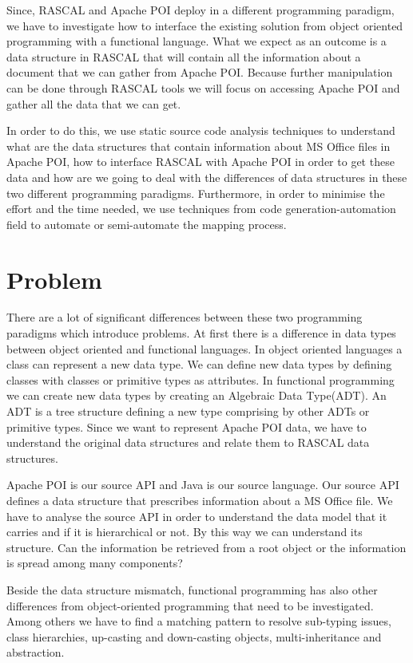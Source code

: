 Since, RASCAL and Apache POI deploy in a different programming paradigm, we have to investigate how to interface the existing solution from object oriented programming with a functional language. What we expect as an outcome is a data structure in RASCAL that will contain all the information about a document that we can gather from Apache POI. Because further manipulation can be done through RASCAL tools we will focus on accessing Apache POI and gather all the data that we can get. 

In order to do this, we use static source code analysis techniques to understand what are the data structures that contain information about MS Office files in Apache POI, how to interface RASCAL with Apache POI in order to get these data and how are we going to deal with the differences of data structures in these two different programming paradigms. Furthermore, in order to minimise the effort and the time needed, we use techniques from code generation-automation field to automate or semi-automate the mapping process.
\section{Problem}

There are a lot of significant differences between these two programming paradigms which introduce problems. At first there is a difference in data types between object oriented and functional languages. In object oriented languages a class can represent a new data type. We can define new data types by defining classes with classes or primitive types as attributes. In functional programming we can create new data types by creating an Algebraic Data Type(ADT). An ADT is a tree structure defining a new type comprising by other ADTs or primitive types. Since we want to represent Apache POI data, we have to understand the original data structures and relate them to RASCAL data structures.

Apache POI is our source API and Java is our source language. Our source API defines a data structure that prescribes information about a MS Office file. We have to analyse the source API in order to understand the data model that it carries and if it is hierarchical or not. By this way we can understand its structure. Can the information be retrieved from a root object or the information is spread among many components?

Beside the data structure mismatch, functional programming has also other differences from object-oriented programming that need to be investigated. Among others we have to find a matching pattern to resolve sub-typing issues, class hierarchies, up-casting and down-casting objects, multi-inheritance and abstraction.

